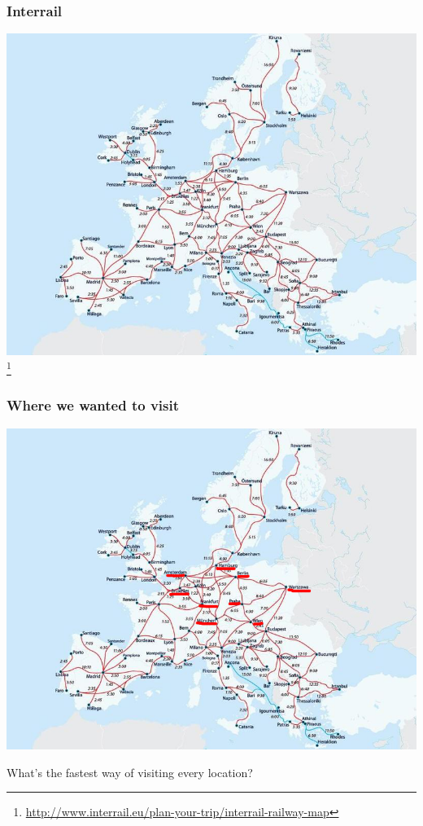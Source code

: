 \documentclass[aspectratio=169]{beamer}
\begin{document}
\begin{frame}
\frametitle{Interrail}
\begin{center}
\includegraphics[scale=0.35]{interrail}\footnote{\url{http://www.interrail.eu/plan-your-trip/interrail-railway-map}}
\end{center}
\end{frame}

\begin{frame}
\frametitle{Where we wanted to visit}
\begin{center}
\includegraphics[scale=0.25]{interrail_selected}
\end{center}
What's the fastest way of visiting every location?
\end{frame}
\end{document}

